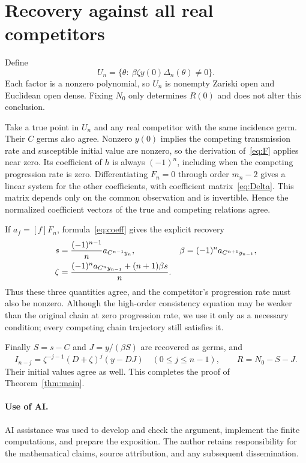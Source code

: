 \documentclass[11pt,a4paper]{article}
\begin{document}
\section{Recovery against all real competitors}
Define
\begin{equation}
 U_n=\{\theta:\ \beta\zeta y(0)\Delta_n(\theta)\ne0\}.
\end{equation}
Each factor is a nonzero polynomial, so $U_n$ is nonempty Zariski open and Euclidean open dense. Fixing $N_0$ only determines $R(0)$ and does not alter this conclusion.

Take a true point in $U_n$ and any real competitor with the same incidence germ. Their $C$ germs also agree. Nonzero $y(0)$ implies the competing transmission rate and susceptible initial value are nonzero, so the derivation of~\eqref{eq:F} applies near zero. Its coefficient of $h$ is always $(-1)^n$, including when the competing progression rate is zero. Differentiating $F_n=0$ through order $m_n-2$ gives a linear system for the other coefficients, with coefficient matrix~\eqref{eq:Delta}. This matrix depends only on the common observation and is invertible. Hence the normalized coefficient vectors of the true and competing relations agree.

If $a_f=[f]F_n$, formula~\eqref{eq:coeff} gives the explicit recovery
\begin{align}
 s&=\frac{(-1)^{n-1}}n a_{C^{n-1}y_n},&
 \beta&=(-1)^n a_{C^{n+1}y_{n-1}},\notag\\
 \zeta&=\frac{(-1)^n a_{C^ny_{n-1}}+(n+1)\beta s}{n}.
\end{align}
Thus these three quantities agree, and the competitor's progression rate must also be nonzero. Although the high-order consistency equation may be weaker than the original chain at zero progression rate, we use it only as a necessary condition; every competing chain trajectory still satisfies it.

Finally $S=s-C$ and $J=y/(\beta S)$ are recovered as germs, and
\begin{equation}
 I_{n-j}=\zeta^{-j-1}(D+\zeta)^j(y-DJ)\quad(0\leq j\leq n-1),
 \qquad R=N_0-S-J.
\end{equation}
Their initial values agree as well. This completes the proof of Theorem~\ref{thm:main}.

\paragraph{Use of AI.}
AI assistance was used to develop and check the argument, implement the finite computations, and prepare the exposition. The author retains responsibility for the mathematical claims, source attribution, and any subsequent dissemination.
\end{document}
